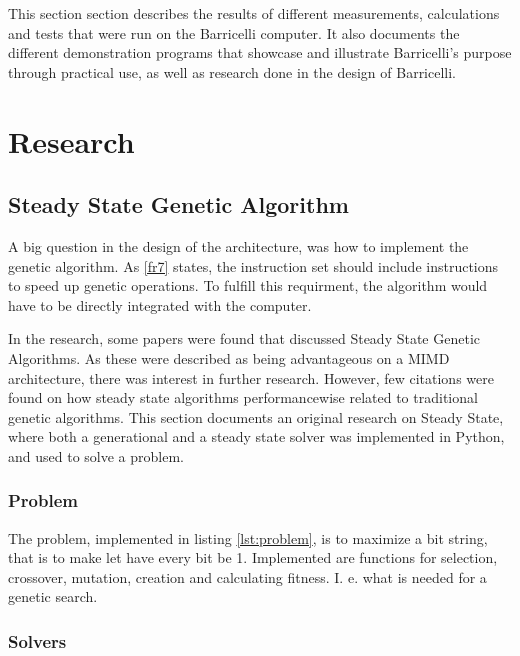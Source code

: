 This section section describes the results of different measurements, calculations and tests that were run on the Barricelli computer.
It also documents the different demonstration programs that showcase and illustrate Barricelli's purpose through practical use, as well as research done in the design of Barricelli.

\section{Research}

\subsection{Steady State Genetic Algorithm}
A big question in the design of the architecture, was how to implement the genetic algorithm.
As \vref{fr7} states, the instruction set should include instructions to speed up genetic operations.
To fulfill this requirment, the algorithm would have to be directly integrated with the computer.

In the research, some papers were found that discussed Steady State Genetic Algorithms.\cite{vlsi-ga}
As these were described as being advantageous on a MIMD architecture, there was interest in further research.
However, few citations were found on how steady state algorithms performancewise related to traditional genetic algorithms.
This section documents an original research on Steady State, where both a generational and a steady state solver was implemented in Python, and used to solve a problem.

\subsubsection{Problem}
 

The problem, implemented in listing \ref{lst:problem}, is to maximize a bit string, that is to make let have every bit be 1.
Implemented are functions for selection, crossover, mutation, creation and calculating fitness.
I. e. what is needed for a genetic search.

\subsubsection{Solvers}
 

